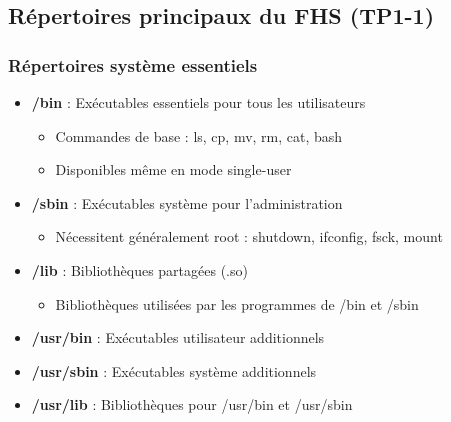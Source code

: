 \documentclass[12pt,a4paper]{article}
\begin{document}
\subsection{Répertoires principaux du FHS (TP1-1)}

\subsubsection{Répertoires système essentiels}
\begin{itemize}
    \item \textbf{/bin} : Exécutables essentiels pour tous les utilisateurs
    \begin{itemize}
        \item Commandes de base : ls, cp, mv, rm, cat, bash
        \item Disponibles même en mode single-user
    \end{itemize}
    \item \textbf{/sbin} : Exécutables système pour l'administration
    \begin{itemize}
        \item Nécessitent généralement root : shutdown, ifconfig, fsck, mount
    \end{itemize}
    \item \textbf{/lib} : Bibliothèques partagées (.so)
    \begin{itemize}
        \item Bibliothèques utilisées par les programmes de /bin et /sbin
    \end{itemize}
    \item \textbf{/usr/bin} : Exécutables utilisateur additionnels
    \item \textbf{/usr/sbin} : Exécutables système additionnels
    \item \textbf{/usr/lib} : Bibliothèques pour /usr/bin et /usr/sbin
\end{itemize}
\end{document}
